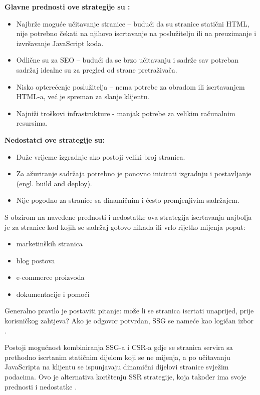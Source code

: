 \bigskip
\textbf{Glavne prednosti ove strategije su \cite{moore2024rendering}: }
\begin{itemize}
    \item Najbrže moguće učitavanje stranice – budući da su stranice statični HTML, nije potrebno čekati na njihovo iscrtavanje na poslužitelju ili na preuzimanje i izvršavanje JavaScript koda.
    \item Odlične su za SEO – budući da se brzo učitavanju i sadrže sav potreban sadržaj idealne su za pregled od strane pretraživača.
    \item Nisko opterećenje poslužitelja – nema potrebe za obradom ili iscrtavanjem HTML-a, već je spreman za slanje klijentu.
    \item Najniži troškovi infrastrukture - manjak potrebe za velikim računalnim resursima.
\end{itemize}

\bigskip

\textbf{Nedostatci ove strategije su:}

\begin{itemize}
    \item Duže vrijeme izgradnje ako postoji veliki broj stranica.
    \item Za ažuriranje sadržaja potrebno je ponovno inicirati izgradnju i postavljanje (engl. build and deploy).
    \item Nije pogodno za stranice sa dinamičnim i često promjenjivim sadržajem.
\end{itemize}

S obzirom na navedene prednosti i nedostatke ova strategija iscrtavanja najbolja je za stranice kod kojih se sadržaj gotovo nikada ili vrlo rijetko mijenja poput:
\begin{itemize}
    \item marketinških stranica
    \item blog postova
    \item e-commerce proizvoda
    \item dokumentacije i pomoći
\end{itemize}
Generalno pravilo je postaviti pitanje: može li se stranica iscrtati unaprijed, prije korisničkog zahtjeva? Ako je odgovor potvrdan, SSG se nameće kao logičan izbor \cite{nextjsssg}.

Postoji mogućnost kombiniranja SSG-a i CSR-a gdje se stranica servira sa prethodno iscrtanim statičnim dijelom koji se ne mijenja, a po učitavanju JavaScripta na klijentu se ispunjavaju dinamični dijelovi stranice svježim podacima. Ovo je alternativa korištenju SSR strategije, koja također ima svoje prednosti i nedostatke \cite{nextjsssg}.

